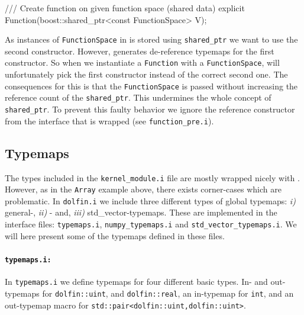 \begin{code}
\begin{code}
/// Create function on given function space (shared data)
explicit Function(boost::shared_ptr<const FunctionSpace> V);
\end{code}
As instances of \texttt{FunctionSpace} in \pydolfin is stored using \texttt{shared\_ptr} we want \swig to use the second constructor. However, \swig generates de-reference typemaps for the first constructor. So when we instantiate a \texttt{Function} with a \texttt{FunctionSpace}, \swig will unfortunately pick the first constructor instead of the correct second one. The consequences for this is that the \texttt{FunctionSpace} is passed without increasing the reference count of the \texttt{shared\_ptr}. This undermines the whole concept of \texttt{shared\_ptr}. To prevent this faulty behavior we ignore the reference constructor from the interface that is wrapped (see \texttt{function\_pre.i}).
\begin{code}
\end{code}

\subsection{Typemaps}
The types included in the \texttt{kernel\_module.i} file are mostly wrapped nicely with \swig. However, as in the \texttt{Array} example above, there exists corner-cases which are problematic. In \texttt{dolfin.i} we include three different types of global typemaps: \textit{i)} general-, \textit{ii)} \numpy- and, \textit{iii)} std\_vector-typemaps. These are implemented in the interface files: \texttt{typemaps.i}, \texttt{numpy\_}\texttt{typemaps.i} and \texttt{std\_}\texttt{vector\_}\texttt{typemaps.i}. We will here present some of the typemaps defined in these files.\par

\paragraph{\texttt{typemaps.i:}}
In \texttt{typemaps.i} we define typemaps for four different basic types. In- and out-typemaps for \texttt{dolfin::uint}, and \texttt{dolfin::real}, an in-typemap for \texttt{int}, and an out-typemap macro for \texttt{std::pair<dolfin::uint,}\-\texttt{dolfin::uint>}.\par


\end{code}
